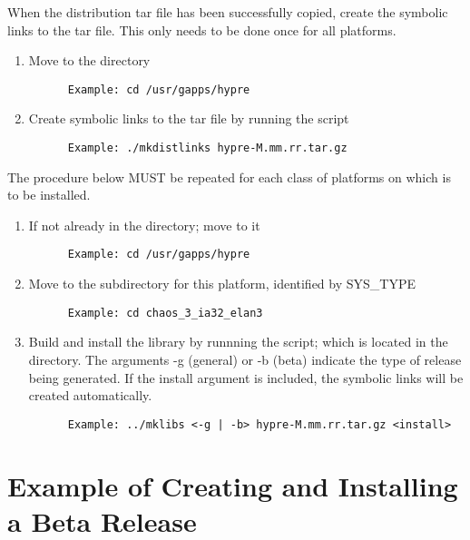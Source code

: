 When the distribution tar file has been successfully copied, create the symbolic
links to the tar file. This only needs to be done once for all platforms.

\begin{enumerate}
\item Move to the  directory
\begin{verbatim}
      Example: cd /usr/gapps/hypre
\end{verbatim}
\item Create symbolic links to the tar file by running the  script
\begin{verbatim}
      Example: ./mkdistlinks hypre-M.mm.rr.tar.gz
\end{verbatim}
\end{enumerate}

The procedure below MUST be repeated for each class of platforms on which \hypre{} is 
to be installed. 

\begin{enumerate}
\item If not already in the  directory; move to it
\begin{verbatim}
      Example: cd /usr/gapps/hypre
\end{verbatim}
\item Move to the subdirectory for this platform, identified by SYS\_TYPE
\begin{verbatim}
      Example: cd chaos_3_ia32_elan3
\end{verbatim}
\item Build and install the library by runnning the  script; which is
         located in the  directory.
      The arguments -g (general) or -b (beta) indicate the type of release being 
          generated.  If the install argument is included, the symbolic links will 
          be created automatically.
\begin{verbatim}
      Example: ../mklibs <-g | -b> hypre-M.mm.rr.tar.gz <install>
\end{verbatim}
\end{enumerate}

\section{Example of Creating and Installing a Beta Release}
\label{Example of Creating and Installing a Beta Release}

